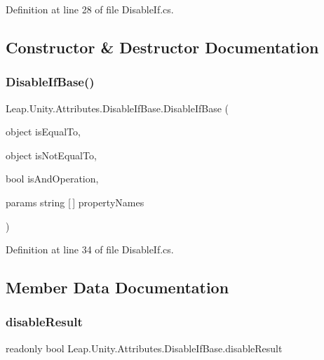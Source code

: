 Definition at line 28 of file Disable\+If.\+cs.



\subsection{Constructor \& Destructor Documentation}
\mbox{\label{class_leap_1_1_unity_1_1_attributes_1_1_disable_if_base_a4bbcfc61cfc971972a5ea0725916a44e}} 
\subsubsection{\texorpdfstring{DisableIfBase()}{DisableIfBase()}}
{\footnotesize\ttfamily Leap.\+Unity.\+Attributes.\+Disable\+If\+Base.\+Disable\+If\+Base (\begin{DoxyParamCaption}\item[{object}]{is\+Equal\+To,  }\item[{object}]{is\+Not\+Equal\+To,  }\item[{bool}]{is\+And\+Operation,  }\item[{params string \mbox{[}$\,$\mbox{]}}]{property\+Names }\end{DoxyParamCaption})}



Definition at line 34 of file Disable\+If.\+cs.



\subsection{Member Data Documentation}
\mbox{\label{class_leap_1_1_unity_1_1_attributes_1_1_disable_if_base_ae9879c16470936206d68800ce2dfa26a}} 
\subsubsection{\texorpdfstring{disableResult}{disableResult}}
{\footnotesize\ttfamily readonly bool Leap.\+Unity.\+Attributes.\+Disable\+If\+Base.\+disable\+Result}



